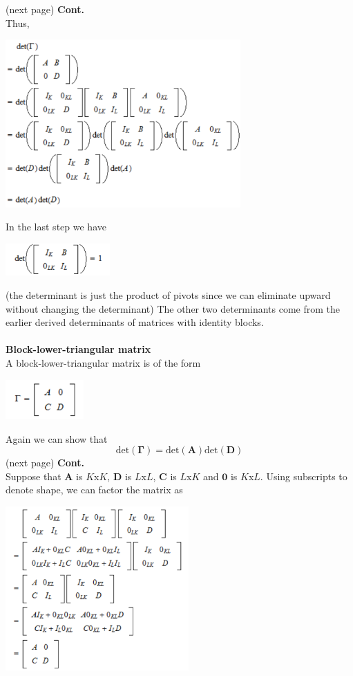 \documentclass{report}
\begin{document}
(next page)\newpage
\noindent\textbf{Cont.}\\
Thus,
\begin{center}
\includegraphics[width=9cm]{126}
\end{center}
In the last step we have 
\begin{center}
\includegraphics[width=4cm]{127}
\end{center}
(the determinant is just the product of pivots since we can eliminate upward without changing the determinant) The other two determinants come from
the earlier derived determinants of matrices with identity blocks.\\
\vspace{1mm}\\
\textbf{Block-lower-triangular matrix}\\
A block-lower-triangular matrix is of the form
\begin{center}
\includegraphics[width=3cm]{128}
\end{center}
Again we can show that
\begin{equation*}
\text{det}(\bm\Gamma)=\text{det}(\bm A)\text{det}(\bm D)
\end{equation*}
(next page)\newpage
\noindent\textbf{Cont.}\\
Suppose that $\bm A$ is $K$x$K$, $\bm D$ is $L$x$L$, $\bm C$ is $L$x$K$ and $\bm 0$ is $K$x$L$. Using subscripts to denote shape, we can factor the matrix as
\begin{center}
\includegraphics[width=7cm]{129}
\end{center}
\end{document}
